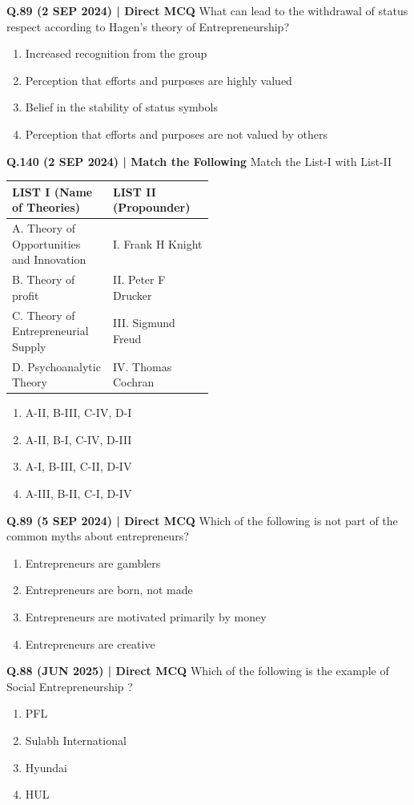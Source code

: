 \documentclass{article}
\begin{document}
\textbf{Q.89 (2 SEP 2024) | Direct MCQ}
What can lead to the withdrawal of status respect according to Hagen's theory of Entrepreneurship?
\begin{enumerate}[label=(\arabic*)]
    \item Increased recognition from the group
    \item Perception that efforts and purposes are highly valued
    \item Belief in the stability of status symbols
    \item Perception that efforts and purposes are not valued by others
\end{enumerate}

\textbf{Q.140 (2 SEP 2024) | Match the Following}
Match the List-I with List-II
\begin{tabularx}{\linewidth}{@{} p{0.5\linewidth} X @{}}
    \toprule
    \textbf{LIST I (Name of Theories)} & \textbf{LIST II (Propounder)} \\
    \midrule
    A. Theory of Opportunities and Innovation & I. Frank H Knight \\
    B. Theory of profit & II. Peter F Drucker \\
    C. Theory of Entrepreneurial Supply & III. Sigmund Freud \\
    D. Psychoanalytic Theory & IV. Thomas Cochran \\
    \bottomrule
\end{tabularx}
\begin{enumerate}[label=(\arabic*)]
    \item A-II, B-III, C-IV, D-I
    \item A-II, B-I, C-IV, D-III
    \item A-I, B-III, C-II, D-IV
    \item A-III, B-II, C-I, D-IV
\end{enumerate}

\textbf{Q.89 (5 SEP 2024) | Direct MCQ}
Which of the following is not part of the common myths about entrepreneurs?
\begin{enumerate}[label=(\arabic*)]
    \item Entrepreneurs are gamblers
    \item Entrepreneurs are born, not made
    \item Entrepreneurs are motivated primarily by money
    \item Entrepreneurs are creative
\end{enumerate}

\textbf{Q.88 (JUN 2025) | Direct MCQ}
Which of the following is the example of Social Entrepreneurship ?
\begin{enumerate}[label=(\arabic*)]
    \item PFL
    \item Sulabh International
    \item Hyundai
    \item HUL
\end{enumerate}
\end{document}
